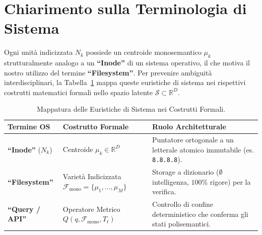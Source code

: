 \documentclass[10pt,twocolumn]{article}
\theoremstyle{definition}
\begin{document}
\section{Chiarimento sulla Terminologia di Sistema}
Ogni unità indicizzata $N_k$ possiede un centroide monosemantico $\mu_k$ strutturalmente analogo a un \textbf{``Inode''} di un sistema operativo, il che motiva il nostro utilizzo del termine \textbf{``Filesystem''}. Per prevenire ambiguità interdisciplinari, la Tabella~\ref{tab:terminology} mappa queste euristiche di sistema nei rispettivi costrutti matematici formali nello spazio latente $\mathcal{S} \subset \mathbb{R}^D$.

\begin{table}[h]
\centering
\caption{Mappatura delle Euristiche di Sistema nei Costrutti Formali.}
\label{tab:terminology}
\vspace{0.15cm}
\scriptsize
\begin{tabular}{@{}p{1.9cm}p{2.3cm}p{3.0cm}@{}}
\toprule
\textbf{Termine OS} & \textbf{Costrutto Formale} & \textbf{Ruolo Architetturale} \\ \midrule
\textbf{``Inode''} ($N_k$) & Centroide $\mu_k \in \mathbb{R}^D$ & Puntatore ortogonale a un letterale atomico immutabile (es. \texttt{8.8.8.8}). \\[3pt]
\textbf{``Filesystem''} & Varietà Indicizzata $\mathcal{F}_{\mathrm{mono}} = \{\mu_1, \dots, \mu_M\}$ & Storage a dizionario ($\emptyset$ intelligenza, $100\%$ rigore) per la verifica. \\[3pt]
\textbf{``Query / API''} & Operatore Metrico $Q(q, \mathcal{F}_{\mathrm{mono}}, T_t)$ & Controllo di confine deterministico che conferma gli stati polisemantici. \\ \bottomrule
\end{tabular}
\end{table}
\end{document}
